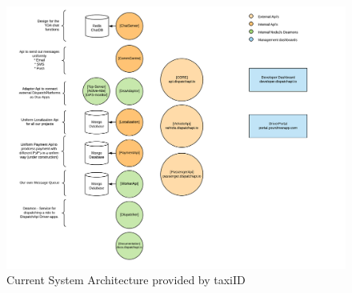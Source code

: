 \begin{figure}[htbp!]
	\centering
	\includegraphics[width=1\textwidth]{Architecture}
	\caption[Architecture]{Current System Architecture provided by taxiID}
	\label{fig:Architecture}
\end{figure}



